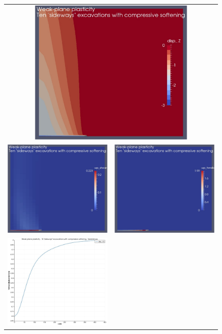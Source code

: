 \documentclass[]{scrreprt}
\begin{document}
\begin{figure}[p]
\begin{center}
\begin{tabular}{cc}
\multicolumn{2}{c}{\includegraphics[width=8cm]{wp_only_10_sideways_soften_disp.pdf}}
  \\
\includegraphics[width=6cm]{wp_only_10_sideways_soften_shear.pdf} &
\includegraphics[width=6cm]{wp_only_10_sideways_soften_tensile.pdf} \\
\includegraphics[width=6cm]{wp_only_10_sideways_soften_subsidence.pdf} &

\end{tabular}
\end{center}
\end{figure}
\end{document}

